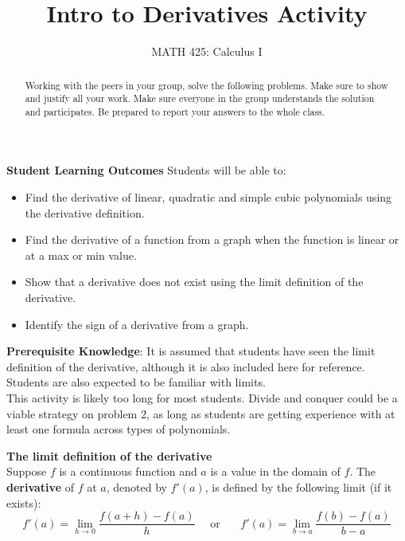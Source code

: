 \documentclass{ximera}
\title{Intro to Derivatives Activity}
\author{MATH 425: Calculus I}
\begin{document}
\begin{abstract}
    Working with the peers in your group, solve the following problems. Make sure to show and justify all your work. Make sure everyone in the group understands the solution and participates. Be prepared to report your answers to the whole class. 
\end{abstract}
\maketitle

\textbf{Student Learning Outcomes}
Students will be able to:
\begin{itemize}
    \item Find the derivative of linear, quadratic and simple cubic polynomials using the derivative definition.
    \item Find the derivative of a function from a graph when the function is linear or at a max or min value.
    \item Show that a derivative does not exist using the limit definition of the derivative.
    \item Identify the sign of a derivative from a graph.
\end{itemize}

\textbf{Prerequisite Knowledge}: It is assumed that students have seen the limit definition of the derivative, although it is also included here for reference.  Students are also expected to be familiar with limits.  \\

This activity is likely too long for most students.  Divide and conquer could be a viable strategy on problem 2, as long as students are getting experience with at least one formula across types of polynomials.  

\begin{definition}
        \textbf{The limit definition of the derivative}\\
        Suppose $f$ is a continuous function and $a$ is a value in the domain of $f$. The \textbf{derivative} of $f$ at $a$, denoted by $f'(a)$, is defined by the following limit (if it exists):
        $$f'(a)=\lim_{h\rightarrow 0}\frac{f(a+h)-f(a)}{h}\,\,\,\,\,\,\,\,\text{or}\,\,\,\,\,\,\,\,\,\,\,f'(a)=\lim_{b\rightarrow a}\frac{f(b)-f(a)}{b-a}$$
\end{definition}
\end{document}
